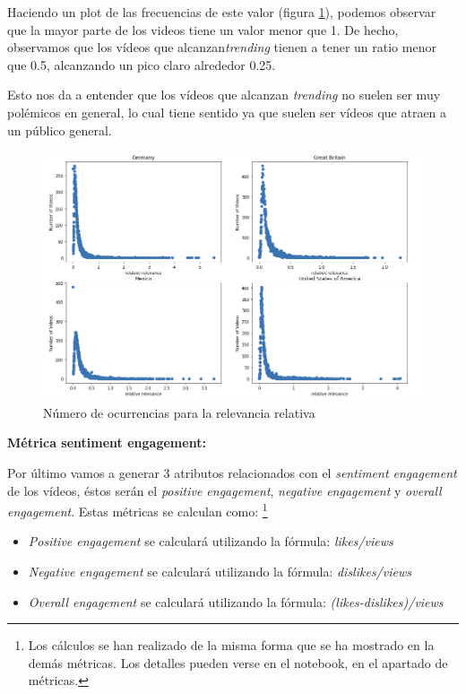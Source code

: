 \documentclass[a4paper,12pt]{article}
\begin{document}
Haciendo un plot de las frecuencias de este valor (figura \ref{fig:relfig}), podemos observar que la mayor parte de los videos tiene un valor menor que  1.  De hecho, observamos que los v\'ideos que alcanzan{\itshape trending} tienen a tener un ratio menor que 0.5, alcanzando un pico claro alrededor 0.25.

Esto nos da a entender que los v\'ideos que alcanzan {\itshape trending} no suelen ser muy pol\'emicos en general, lo cual tiene sentido ya que suelen ser v\'ideos que atraen a un p\'ublico general.

\begin{figure}[h!]
\centering
\includegraphics[width=14cm]{rel_relevance_plot.png}
\caption{N\'umero de ocurrencias para la relevancia relativa}
\label{fig:relfig}

\end{figure}

\textbf{M\'etrica sentiment engagement:}

Por \'ultimo vamos a generar 3 atributos relacionados con el {\itshape sentiment engagement} de los v\'ideos, \'estos ser\'an el {\itshape positive engagement}, {\itshape negative engagement} y {\itshape overall engagement}.
\newpage
Estas m\'etricas se calculan como: \footnote{Los c\'alculos se han realizado de la misma forma que se ha mostrado en la dem\'as m\'etricas. Los detalles pueden verse en el notebook, en el apartado de m\'etricas.}

\begin{itemize}
\item {\itshape Positive engagement} se calcular\'a utilizando la f\'ormula: {\itshape likes/views}


\item {\itshape Negative engagement} se calcular\'a utilizando la f\'ormula: {\itshape dislikes/views}


\item {\itshape Overall engagement} se calcular\'a utilizando la f\'ormula: {\itshape (likes-dislikes)/views}

\end{itemize}
\end{document}
